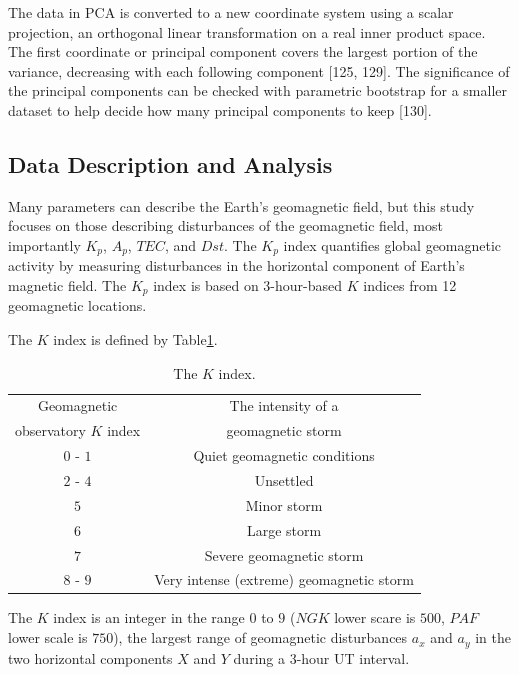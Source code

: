 \documentclass[sn-mathphys-num]{sn-jnl}%
\begin{document}
The data in PCA is converted to a new coordinate system using a scalar projection, an orthogonal linear transformation on a real inner product space. The first coordinate or principal component covers the largest portion of the variance, decreasing with each following component [125, 129]. The significance of the principal components can be checked with parametric bootstrap for a smaller dataset to help decide how many principal components to keep [130].

\subsection{Data Description and Analysis}

Many parameters can describe the Earth's geomagnetic field, but this study focuses on those describing disturbances of the geomagnetic field, most importantly $K_p$, $A_p$, $TEC$, and $Dst$. The $K_p$ index quantifies global geomagnetic activity by measuring disturbances in the horizontal component of Earth's magnetic field. The $K_p$ index is based on 3-hour-based $K$ indices from 12 geomagnetic locations.

The $K$ index is defined by Table\ref{tab:K}.

\begin{table}[!ht]
    \centering
    \caption{The $K$ index.}
    \label{tab:K}
    \begin{tabular}{|c|c|}
        \hline
        Geomagnetic & The intensity of a \\ 
        observatory $K$ index & geomagnetic storm \\ \hline
        $0$ - $1$ & Quiet geomagnetic conditions \\ \hline
        $2$ - $4$ & Unsettled \\ \hline
        $5$ & Minor storm \\ \hline
        $6$ & Large storm \\ \hline
        $7$ & Severe geomagnetic storm \\ \hline
        $8$ - $9$ & Very intense (extreme) geomagnetic storm \\ \hline
    \end{tabular}
\end{table}

The $K$ index is an integer in the range $0$ to $9$ ($NGK$ lower scare is $500$, $PAF$ lower scale is $750$), the largest range of geomagnetic disturbances $a_x$ and $a_y$ in the two horizontal components $X$ and $Y$ during a $3$-hour UT interval.
\end{document}
